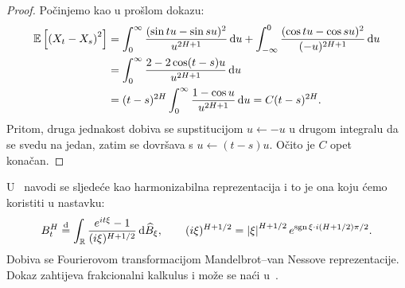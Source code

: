 \documentclass[main.tex]{subfiles}
\begin{document}
\begin{proof}
	Počinjemo kao u prošlom dokazu:
	\begin{align}
		\mathbb{E} \left[ \left( X_t-X_s \right)^2 \right] & =
		\int_0^\infty \frac{(\sin tu - \sin su)^2}{u^{2H+1}} \,\mathrm d u +
		\int_{-\infty}^0 \frac{(\cos tu - \cos su)^2}{(-u)^{2H+1}} \,\mathrm d u                                  \\
		                                           & = \int_0^\infty \frac{2-2\cos(t-s)u}{u^{2H+1}} \,\mathrm d u \\ &=  (t-s)^{2H}\int_0^\infty \frac{1-\cos u}{u^{2H+1}} \,\mathrm d u =C(t-s)^{2H}.
	\end{align}
	Pritom, druga jednakost dobiva se supstitucijom \( u \leftarrow -u \)
	u drugom integralu da se svedu na jedan, zatim se
	dovršava s \( u \leftarrow (t-s)u \). Očito je \( C \) opet konačan.
\end{proof}

\begin{komentar}\label{kom:harmrep}
	U~\cite{ayache} navodi se sljedeće kao harmonizabilna reprezentacija i to
	je ona koju ćemo koristiti u nastavku:
	\begin{equation}\label{eq:harmrep}
		B^H_t \stackrel{\mathrm d}{=}
		\int_{\mathbb{R}} \frac{e^{it\xi}-1}{(i\xi)^{H+1/2}} \,\mathrm d \widehat{B}_\xi,
		\qquad
		(i\xi)^{H+1/2} = \left| {\xi} \right|^{H+1/2}e^{\operatorname{sgn}\xi \cdot i(H+1/2)\pi/2}.
	\end{equation}
	Dobiva se Fourierovom transformacijom Mandelbrot--van Nessove reprezentacije. Dokaz
	zahtijeva frakcionalni kalkulus i može se naći u~\cite{ojeda}.
\end{komentar}
\end{document}
